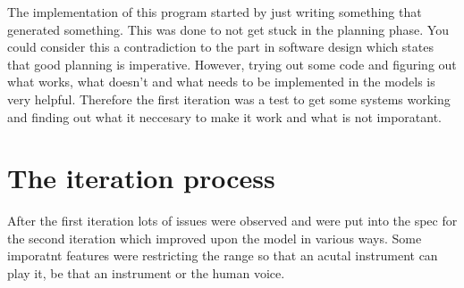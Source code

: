 

The implementation of this program started by just writing something that generated something. This was done to not get stuck in the planning phase. You could consider this a contradiction to the part in software design which states that good planning is imperative. However, trying out some code and figuring out what works, what doesn't and what needs to be implemented in the models is very helpful. Therefore the first iteration was a test to get some systems working and finding out what it neccesary to make it work and what is not imporatant.

\section{The iteration process}
After the first iteration lots of issues were observed and were put into the spec for the second iteration which improved upon the model in various ways. Some imporatnt features were restricting the range so that an acutal instrument can play it, be that an instrument or the human voice. 


